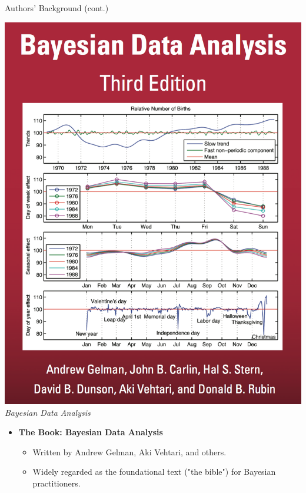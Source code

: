 \documentclass{beamer}
\begin{document}
\begin{frame}{Authors' Background (cont.)}
\vspace{0.5em} %
\begin{minipage}{0.35\textwidth}
    \includegraphics[width=\textwidth]{bayesian_data_analysis_cover.png} %
    \centering
    \small \textit{Bayesian Data Analysis}
\end{minipage}
\hfill
\begin{minipage}{0.6\textwidth}
    \small %
    \begin{itemize}
        \item \textbf{The Book: Bayesian Data Analysis}
        \begin{itemize}
            \item Written by Andrew Gelman, Aki Vehtari, and others.
            \item Widely regarded as the foundational text ("the bible") for Bayesian practitioners.

\end{itemize}
\end{itemize}
\end{minipage}
\end{frame}
\end{document}
